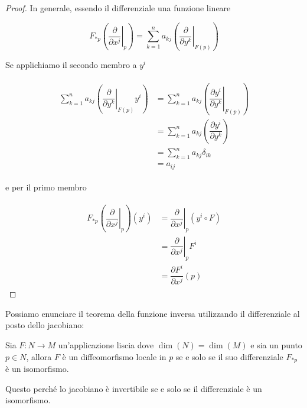 \begin{proof}
	In generale, essendo il differenziale una funzione lineare
	
	\begin{equation}
		F_{*p} \left( \left. \dfrac{\partial}{\partial x^{j}} \right|_{p} \right) = \sum_{k=1}^{n} a_{kj} \left( \left. \dfrac{\partial}{\partial y^{k}} \right|_{F(p)} \right)
	\end{equation}
	
	Se applichiamo il secondo membro a $ y^{i} $
	
	\begin{align}
		\begin{split}
			\sum_{k=1}^{n} a_{kj} \left( \left. \dfrac{\partial}{\partial y^{k}} \right|_{F(p)} y^{i} \right) &= \sum_{k=1}^{n} a_{kj} \left( \left. \dfrac{\partial y^{i}}{\partial y^{k}} \right|_{F(p)} \right)\\
			&= \sum_{k=1}^{n} a_{kj} \left( \dfrac{\partial y^{i}}{\partial y^{k}} \right)\\
			&= \sum_{k=1}^{n} a_{kj} \delta_{ik}\\
			&= a_{ij}
		\end{split}
	\end{align}
	
	e per il primo membro
	
	\begin{align}
		\begin{split}
			F_{*p} \left( \left. \dfrac{\partial}{\partial x^{j}} \right|_{p} \right) (y^{i}) &= \left. \dfrac{\partial}{\partial x^{j}} \right|_{p} (y^{i} \circ F)\\
			&= \left. \dfrac{\partial}{\partial x^{j}} \right|_{p} F^{i}\\
			&= \dfrac{\partial F^{i}}{\partial x^{j}} (p)
		\end{split}
	\end{align}
\end{proof}

\begin{remark}
	Possiamo enunciare il teorema della funzione inversa utilizzando il differenziale al posto dello jacobiano:
	
	\begin{theorem}
		Sia $ F : N \to M $ un'applicazione liscia dove $ \dim(N) = \dim(M) $ e sia un punto $ p \in N $, allora $ F $ è un diffeomorfismo locale in $ p $ se e solo se il suo differenziale $ F_{*p} $ è un isomorfismo.
	\end{theorem}

	Questo perché lo jacobiano è invertibile se e solo se il differenziale è un isomorfismo.
\end{remark}

